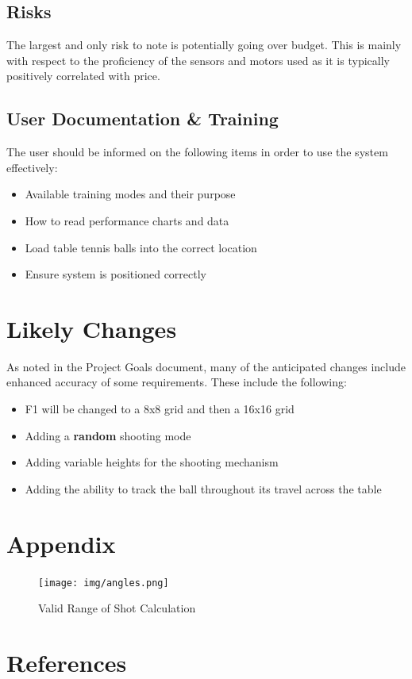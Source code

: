 \documentclass[11pt]{article}
\begin{document}
\subsection{Risks}
The largest and only risk to note is potentially going over budget. This is mainly with respect to the proficiency of the sensors and motors used as it is typically positively correlated with price. 
\subsection{User Documentation \& Training}
The user should be informed on the following items in order to use the system effectively:
\begin{itemize}
\item Available training modes and their purpose
\item How to read performance charts and data
\item Load table tennis balls into the correct location
\item Ensure system is positioned correctly
\end{itemize}
\section{Likely Changes}
As noted in the Project Goals document, many of the anticipated changes include enhanced accuracy of some requirements. These include the following:
\begin{itemize}
\item F1 will be changed to a 8x8 grid and then a 16x16 grid
\item Adding a \textbf{random} shooting mode
\item Adding variable heights for the shooting mechanism
\item Adding the ability to track the ball throughout its travel across the table
\end{itemize}
\section{Appendix}
\begin{figure}[H]
\centering
\texttt{[image: img/angles.png]}
\caption{Valid Range of Shot Calculation}
\label{fig:calc}
\end{figure}
\section{References}
\printbibliography
\end{document}
